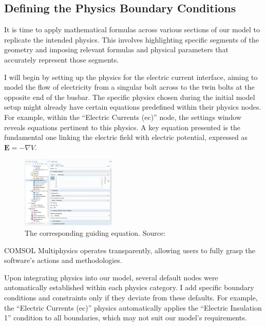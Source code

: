 \subsection{Defining the Physics Boundary Conditions}
It is time to apply mathematical formulas across various sections of our model to replicate the intended physics. This involves highlighting specific segments of the geometry and imposing relevant formulas and physical parameters that accurately represent those segments.

I will begin by setting up the physics for the electric current interface, aiming to model the flow of electricity from a singular bolt across to the twin bolts at the opposite end of the busbar. The specific physics chosen during the initial model setup might already have certain equations predefined within their physics nodes. For example, within the ``Electric Currents (ec)'' node, the settings window reveals equations pertinent to this physics. A key equation presented is the fundamental one linking the electric field with electric potential, expressed as $\mathbf{E} = -\nabla V$.

\begin{figure}[ht!]
  \centering
  \includegraphics[width=0.4\textwidth]{Chapters/Figures/Chapter 3 Figures/Electrical Currents Physics Equation.png}
  \caption{The corresponding guiding equation. Source: \cite{multiphysics__modeling_nodate}}
  \label{fig:the guiding equation}
\end{figure}

COMSOL Multiphysics operates transparently, allowing users to fully grasp the software's actions and methodologies.

Upon integrating physics into our model, several default nodes were automatically established within each physics category. I add specific boundary conditions and constraints only if they deviate from these defaults. For example, the ``Electric Currents (ec)'' physics automatically applies the ``Electric Insulation 1'' condition to all boundaries, which may not suit our model's requirements.


